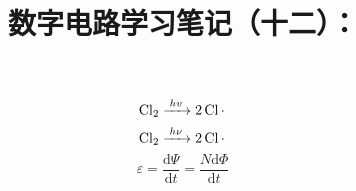 \documentclass[UTF8]{ctexart}
\title{数字电路学习笔记（十二）：}
\begin{document}
\maketitle
\[\ce{Cl2 ->[$hv$] 2Cl*}\]
\[\ce{Cl2 ->[$h\nu$] 2Cl*}\]
\[\varepsilon=\frac{\mathrm{d}\Psi}{\mathrm{d}t}=\frac{N\mathrm{d}\Phi}{\mathrm{d}t}\]
\end{document}
